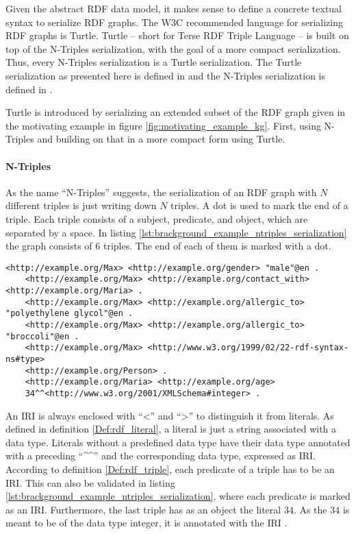     Given the abstract RDF data model, it makes sense to define a concrete textual syntax to serialize RDF graphs. The W3C recommended language for serializing RDF graphs is Turtle. Turtle -- short for Terse RDF Triple Language -- is built on top of the N-Triples serialization, with the goal of a more compact serialization. Thus, every N-Triples serialization is a Turtle serialization. \cite{beckett2014rdf} The Turtle serialization as presented here is defined in \cite{beckett2014rdf} and the N-Triples serialization is defined in \cite{beckett2014ntriples}.
    
    Turtle is introduced by serializing an extended subset of the RDF graph given in the motivating example in figure \ref{fig:motivating_example_kg}. First, using N-Triples and building on that in a more compact form using Turtle.
    
    \paragraph{N-Triples} As the name ``N-Triples'' suggests, the serialization of an RDF graph with $N$ different triples is just writing down $N$ triples. A dot is used to mark the end of a triple. Each triple consists of a subject, predicate, and object, which are separated by a space. In listing \ref{lst:brackground_example_ntriples_serialization} the graph consists of $6$ triples. The end of each of them is marked with a dot. 
    
    \lstset{language=html}
    \begin{lstlisting}[float, captionpos=b, caption=N-Triples serialization of a superset of a subgraph of figure \ref{fig:motivating_example_kg}, label=lst:brackground_example_ntriples_serialization, basicstyle=\ttfamily, frame=single]
    <http://example.org/Max> <http://example.org/gender> "male"@en .
    <http://example.org/Max> <http://example.org/contact_with> <http://example.org/Maria> .
    <http://example.org/Max> <http://example.org/allergic_to> "polyethylene glycol"@en .
    <http://example.org/Max> <http://example.org/allergic_to> "broccoli"@en .
    <http://example.org/Max> <http://www.w3.org/1999/02/22-rdf-syntax-ns#type> 
    <http://example.org/Person> .
    <http://example.org/Maria> <http://example.org/age> 
    34^^<http://www.w3.org/2001/XMLSchema#integer> .
    \end{lstlisting}
    
    An IRI is always enclosed with ``<'' and ``>'' to distinguish it from literals. As defined in definition \ref{Def:rdf_literal}, a literal is just a string associated with a data type. Literals without a predefined data type have their data type annotated with a preceding ``\^{}\^{}'' and the corresponding data type, expressed as IRI. According to definition \ref{Def:rdf_triple}, each predicate of a triple has to be an IRI. This can also be validated in listing \ref{lst:brackground_example_ntriples_serialization}, where each predicate is marked as an IRI. Furthermore, the last triple has as an object the literal $34$. As the $34$ is meant to be of the data type integer, it is annotated with the IRI .

